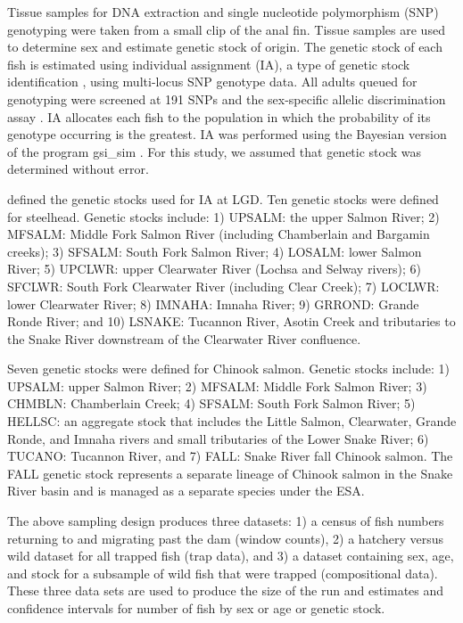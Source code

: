\documentclass[12pt]{article}
\begin{document}
Tissue samples for DNA extraction and single nucleotide polymorphism (SNP) genotyping were taken from a small clip of the anal fin.  Tissue samples are used to determine sex and estimate genetic stock of origin. The genetic stock of each fish is estimated using individual assignment (IA), a type of genetic stock identification  \cite{Pella1987,Shaklee1999}, using multi-locus SNP genotype data.  All adults queued for genotyping were screened at 191 SNPs and the sex-specific allelic discrimination assay \cite{Campbell2012}. IA allocates each fish to the population in which the probability of its genotype occurring is the greatest. IA was performed using the Bayesian version of the program gsi\_sim \cite{Anderson2008,Anderson2010}. For this study, we assumed that genetic stock was determined without error.

 defined the genetic stocks used for IA at LGD. Ten genetic stocks were defined for steelhead. Genetic stocks include: 1) UPSALM: the upper Salmon River; 2) MFSALM: Middle Fork Salmon River (including Chamberlain and Bargamin creeks); 3) SFSALM: South Fork Salmon River; 4) LOSALM: lower Salmon River; 5) UPCLWR: upper Clearwater River (Lochsa and Selway rivers); 6) SFCLWR: South Fork Clearwater River (including Clear Creek); 7) LOCLWR: lower Clearwater River; 8) IMNAHA: Imnaha River; 9) GRROND: Grande Ronde River; and 10) LSNAKE: Tucannon River, Asotin Creek and tributaries to the Snake River downstream of the Clearwater River confluence.

Seven genetic stocks were defined for Chinook salmon. Genetic stocks include: 1) UPSALM: upper Salmon River; 2) MFSALM: Middle Fork Salmon River; 3) CHMBLN: Chamberlain Creek; 4) SFSALM: South Fork Salmon River; 5) HELLSC: an aggregate stock that includes the Little Salmon, Clearwater, Grande Ronde, and Imnaha rivers and small tributaries of the Lower Snake River; 6) TUCANO: Tucannon River, and 7) FALL: Snake River fall Chinook salmon. The FALL genetic stock represents a separate lineage of Chinook salmon in the Snake River basin and is managed as a separate species under the ESA.

The above sampling design produces three datasets: 1) a census of fish numbers returning to and migrating past the dam (window counts), 2) a hatchery versus wild dataset for all trapped fish (trap data), and 3) a dataset containing sex, age, and stock for a subsample of wild fish that were trapped (compositional data). These three data sets are used to produce the size of the run and estimates and confidence intervals for number of fish by sex or age or genetic stock.
\end{document}

